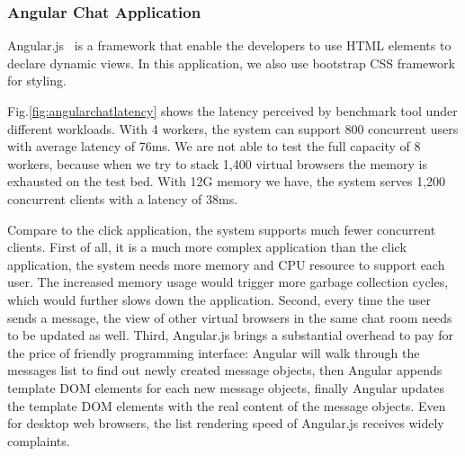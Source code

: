 







\subsubsection{Angular Chat Application}
\label{sec:angular}
Angular.js~\cite{angular} is a \js{} framework that enable the developers to 
use HTML elements to declare dynamic views.
In this application, we also use bootstrap CSS framework for styling.

Fig.\ref{fig:angularchatlatency} shows the latency perceived by benchmark tool
under different workloads.
With 4 workers, the system can support 800 concurrent users with average latency
of 76ms.
We are not able to test the full capacity of 8 workers,
because when we try to stack 1,400 virtual browsers
the memory is exhausted on the test bed.
With 12G memory we have, the system serves 1,200 concurrent clients with a latency of 38ms.

Compare to the click application, the system supports much fewer concurrent clients.
First of all, it is a much more complex application than the click application,
the system needs more memory and CPU resource to support each user.
The increased memory usage would trigger more garbage collection cycles,
which would further slows down the application.
Second, every time the user sends a message, the view of other virtual browsers
in the same chat room needs to be updated as well.
Third, Angular.js brings a substantial overhead 
to pay for the price of friendly programming interface: %
Angular will walk through the messages list to find out newly created
message objects,
then Angular appends template DOM elements for each new message objects,
finally Angular updates the template DOM elements with the real content of the 
message objects.
Even for desktop web browsers, the list rendering speed of Angular.js
receives widely complaints.%

